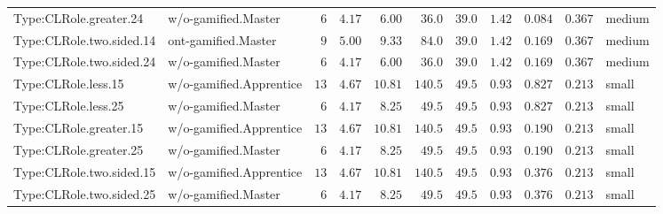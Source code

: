 \documentclass[6pt,a4paper]{article}
\begin{document}
{\begin{longtable}{llrrrrrrrrl}
Type:CLRole.greater.24&w/o-gamified.Master&$ 6$&$4.17$&$ 6.00$&$ 36.0$&$ 39.0$&$1.42$&$0.084$&$0.367$&medium\tabularnewline
Type:CLRole.two.sided.14&ont-gamified.Master&$ 9$&$5.00$&$ 9.33$&$ 84.0$&$ 39.0$&$1.42$&$0.169$&$0.367$&medium\tabularnewline
Type:CLRole.two.sided.24&w/o-gamified.Master&$ 6$&$4.17$&$ 6.00$&$ 36.0$&$ 39.0$&$1.42$&$0.169$&$0.367$&medium\tabularnewline
Type:CLRole.less.15&w/o-gamified.Apprentice&$13$&$4.67$&$10.81$&$140.5$&$ 49.5$&$0.93$&$0.827$&$0.213$&small\tabularnewline
Type:CLRole.less.25&w/o-gamified.Master&$ 6$&$4.17$&$ 8.25$&$ 49.5$&$ 49.5$&$0.93$&$0.827$&$0.213$&small\tabularnewline
Type:CLRole.greater.15&w/o-gamified.Apprentice&$13$&$4.67$&$10.81$&$140.5$&$ 49.5$&$0.93$&$0.190$&$0.213$&small\tabularnewline
Type:CLRole.greater.25&w/o-gamified.Master&$ 6$&$4.17$&$ 8.25$&$ 49.5$&$ 49.5$&$0.93$&$0.190$&$0.213$&small\tabularnewline
\newpage
Type:CLRole.two.sided.15&w/o-gamified.Apprentice&$13$&$4.67$&$10.81$&$140.5$&$ 49.5$&$0.93$&$0.376$&$0.213$&small\tabularnewline
Type:CLRole.two.sided.25&w/o-gamified.Master&$ 6$&$4.17$&$ 8.25$&$ 49.5$&$ 49.5$&$0.93$&$0.376$&$0.213$&small\tabularnewline
\hline
\end{longtable}}
\end{document}
